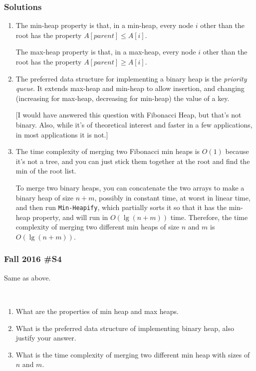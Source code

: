 \subsubsection{Solutions}

\begin{enumerate}[label=\alph*.]
	\item The min-heap property is that, in a min-heap, every node $i$ other than the root has the property $A[parent] \le A[i]$.  
	
	The max-heap property is that, in a max-heap, every node $i$ other than the root has the property $A[parent] \ge A[i]$.  
	
	\item The preferred data structure for implementing a binary heap is the {\it priority queue}.  It extends max-heap and min-heap to allow insertion, and changing (increasing for max-heap, decreasing for min-heap) the value of a key.  
	
	[I would have answered this question with Fibonacci Heap, but that's not binary.  Also, while it's of theoretical interest and faster in a few applications, in most applications it is not.]
	
	\item The time complexity of merging two Fibonacci min heaps is $O(1)$ because it's not a tree, and you can just stick them together at the root and find the min of the root list.  
	
	To merge two binary heaps, you can concatenate the two arrays to make a binary heap of size $n+m$, possibly in constant time, at worst in linear time, and then run \verb|Min-Heapify|, which partially sorts it so that it has the min-heap property, and will run in $O(\lg(n+m))$ time.  Therefore, the time complexity of merging two different min heaps of size $n$ and $m$ is $O(\lg(n+m))$.  
	
\end{enumerate}

\subsubsection{Fall 2016 \#S4}	

Same as above.  

\

	\begin{enumerate}
		\item What are the properties of min heap and max heaps.
		\item What is the preferred data structure of implementing binary heap, also justify your answer.
		\item What is the time complexity of merging two different min heap with sizes of $n$ and $m$.
	\end{enumerate}
	
